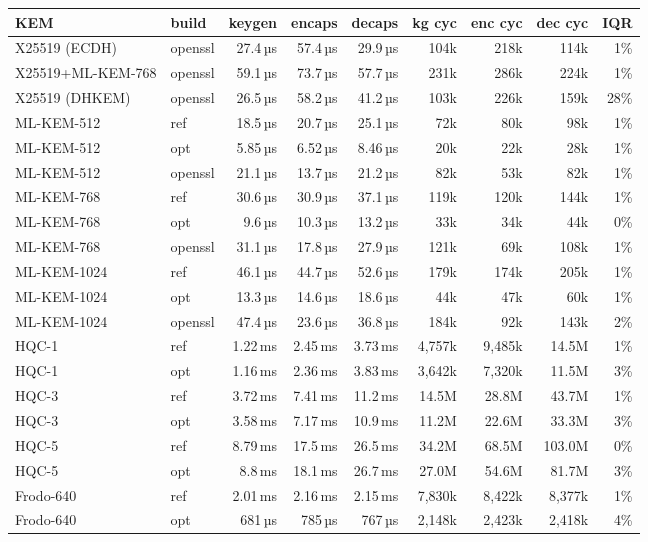 \begin{tabular}{llrrrrrrr}
\toprule
KEM & build & keygen & encaps & decaps & kg cyc & enc cyc & dec cyc & IQR \\
\midrule
X25519 (ECDH) & openssl & 27.4\,µs & 57.4\,µs & 29.9\,µs & 104k & 218k & 114k & 1\% \\
X25519+ML-KEM-768 & openssl & 59.1\,µs & 73.7\,µs & 57.7\,µs & 231k & 286k & 224k & 1\% \\
X25519 (DHKEM) & openssl & 26.5\,µs & 58.2\,µs & 41.2\,µs & 103k & 226k & 159k & 28\% \\
\midrule
ML-KEM-512 & ref & 18.5\,µs & 20.7\,µs & 25.1\,µs & 72k & 80k & 98k & 1\% \\
ML-KEM-512 & opt & 5.85\,µs & 6.52\,µs & 8.46\,µs & 20k & 22k & 28k & 1\% \\
ML-KEM-512 & openssl & 21.1\,µs & 13.7\,µs & 21.2\,µs & 82k & 53k & 82k & 1\% \\
ML-KEM-768 & ref & 30.6\,µs & 30.9\,µs & 37.1\,µs & 119k & 120k & 144k & 1\% \\
ML-KEM-768 & opt & 9.6\,µs & 10.3\,µs & 13.2\,µs & 33k & 34k & 44k & 0\% \\
ML-KEM-768 & openssl & 31.1\,µs & 17.8\,µs & 27.9\,µs & 121k & 69k & 108k & 1\% \\
ML-KEM-1024 & ref & 46.1\,µs & 44.7\,µs & 52.6\,µs & 179k & 174k & 205k & 1\% \\
ML-KEM-1024 & opt & 13.3\,µs & 14.6\,µs & 18.6\,µs & 44k & 47k & 60k & 1\% \\
ML-KEM-1024 & openssl & 47.4\,µs & 23.6\,µs & 36.8\,µs & 184k & 92k & 143k & 2\% \\
\midrule
HQC-1 & ref & 1.22\,ms & 2.45\,ms & 3.73\,ms & 4,757k & 9,485k & 14.5M & 1\% \\
HQC-1 & opt & 1.16\,ms & 2.36\,ms & 3.83\,ms & 3,642k & 7,320k & 11.5M & 3\% \\
HQC-3 & ref & 3.72\,ms & 7.41\,ms & 11.2\,ms & 14.5M & 28.8M & 43.7M & 1\% \\
HQC-3 & opt & 3.58\,ms & 7.17\,ms & 10.9\,ms & 11.2M & 22.6M & 33.3M & 3\% \\
HQC-5 & ref & 8.79\,ms & 17.5\,ms & 26.5\,ms & 34.2M & 68.5M & 103.0M & 0\% \\
HQC-5 & opt & 8.8\,ms & 18.1\,ms & 26.7\,ms & 27.0M & 54.6M & 81.7M & 3\% \\
\midrule
Frodo-640 & ref & 2.01\,ms & 2.16\,ms & 2.15\,ms & 7,830k & 8,422k & 8,377k & 1\% \\
Frodo-640 & opt & 681\,µs & 785\,µs & 767\,µs & 2,148k & 2,423k & 2,418k & 4\% \\

\end{tabular}
